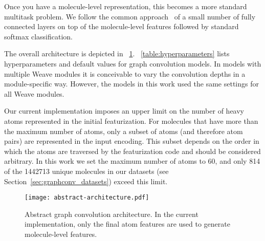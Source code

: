 Once you have a molecule-level representation, this becomes a more standard
multitask problem. We follow the common
approach~\citep{ramsundar2015massively, ma2015deep, mayr2015deeptox}
of a small number of fully connected layers on top of the molecule-level
features followed by standard softmax classification.

The overall architecture is depicted in
\figurename~\ref{fig:abstract_architecture}.
\tablename~\ref{table:hyperparameters} lists hyperparameters and default values
for graph convolution models.
In models with multiple Weave modules it is conceivable to vary the
convolution depths in a module-specific way. However, the models in this work
used the same settings for all Weave modules.

Our current implementation imposes an upper limit on the number of heavy atoms
represented in the initial featurization. For molecules that have more than the
maximum number of atoms, only a subset of atoms (and therefore atom pairs) are
represented in the input encoding. This subset depends on the order in which the
atoms are traversed by the featurization code and should be considered
arbitrary. In this work we set the maximum number of atoms to 60, and only
\num{814} of the \num{1442713} unique molecules in our datasets (see
Section~\ref{sec:graphconv_datasets}) exceed this limit.

\begin{figure}[tb]
\centering
  \texttt{[image: abstract-architecture.pdf]}
  \caption{Abstract graph convolution architecture. In the current
  implementation, only the final atom features are used to generate
  molecule-level features.}
  \label{fig:abstract_architecture}
\end{figure}

